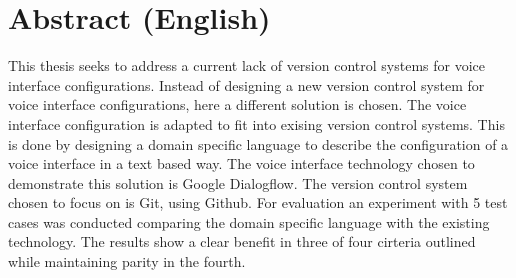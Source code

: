 \chapter{Abstract (English)}

This thesis seeks to address a current lack of version control systems for voice interface configurations. Instead of designing a new version control system for voice interface configurations, here a different solution is chosen. The voice interface configuration is adapted to fit into exising version control systems.
This is done by designing a domain specific language to describe the configuration of a voice interface in a text based way.
The voice interface technology chosen to demonstrate this solution is Google Dialogflow. The version control system chosen to focus on is Git, using Github.
For evaluation an experiment with 5 test cases was conducted comparing the domain specific language with the existing technology.
The results show a clear benefit in three of four cirteria outlined while maintaining parity in the fourth.